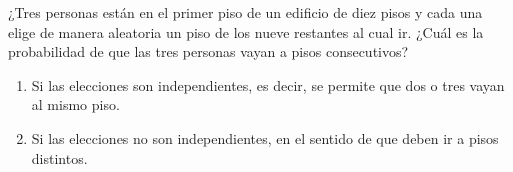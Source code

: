 \message{ !name(tarea2.tex)}\documentclass[12pt,a4paper]{article}
\begin{document}
    \begin{mdframed}[style=mdbluebox,frametitle={Ejercicio 2}]
        ¿Tres personas están en el primer piso de un edificio de diez pisos y cada una elige de manera 
        aleatoria un piso de los nueve restantes al cual ir. ¿Cuál es la probabilidad de que las tres 
        personas vayan a pisos consecutivos?
        \begin{enumerate}
            \item[(a)] Si las elecciones son independientes, es decir, se permite que dos o tres vayan al mismo piso.
            \item[(b)] Si las elecciones no son independientes, en el sentido de que deben ir a pisos distintos.
        \end{enumerate}
    \end{mdframed}
\end{document}
